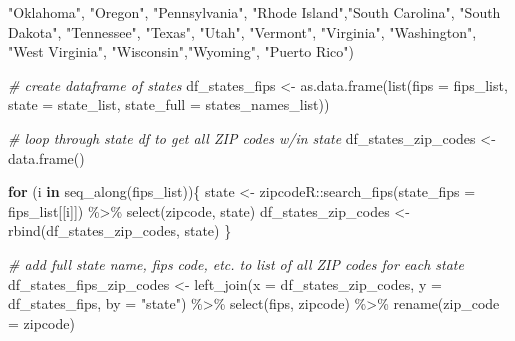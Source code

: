 \documentclass[
  11 pt,
  openany]{book}
\newenvironment{Shaded}{\begin{snugshade}}{\end{snugshade}}
\newcommand{\AttributeTok}[1]{\textcolor[rgb]{0.77,0.63,0.00}{#1}}
\newcommand{\CommentTok}[1]{\textcolor[rgb]{0.56,0.35,0.01}{\textit{#1}}}
\newcommand{\ControlFlowTok}[1]{\textcolor[rgb]{0.13,0.29,0.53}{\textbf{#1}}}
\newcommand{\FunctionTok}[1]{\textcolor[rgb]{0.00,0.00,0.00}{#1}}
\newcommand{\NormalTok}[1]{#1}
\newcommand{\OtherTok}[1]{\textcolor[rgb]{0.56,0.35,0.01}{#1}}
\newcommand{\SpecialCharTok}[1]{\textcolor[rgb]{0.00,0.00,0.00}{#1}}
\newcommand{\StringTok}[1]{\textcolor[rgb]{0.31,0.60,0.02}{#1}}
\begin{document}
\begin{Shaded}
\begin{Highlighting}[]
    \StringTok{"Oklahoma"}\NormalTok{, }\StringTok{"Oregon"}\NormalTok{, }\StringTok{"Pennsylvania"}\NormalTok{, }\StringTok{"Rhode Island"}\NormalTok{,}\StringTok{"South Carolina"}\NormalTok{, }
    \StringTok{"South Dakota"}\NormalTok{, }\StringTok{"Tennessee"}\NormalTok{, }\StringTok{"Texas"}\NormalTok{, }\StringTok{"Utah"}\NormalTok{, }\StringTok{"Vermont"}\NormalTok{, }\StringTok{"Virginia"}\NormalTok{, }
    \StringTok{"Washington"}\NormalTok{, }\StringTok{"West Virginia"}\NormalTok{, }\StringTok{"Wisconsin"}\NormalTok{,}\StringTok{"Wyoming"}\NormalTok{, }\StringTok{"Puerto Rico"}\NormalTok{)}

\CommentTok{\# create dataframe of states}
\NormalTok{df\_states\_fips }\OtherTok{\textless{}{-}} \FunctionTok{as.data.frame}\NormalTok{(}\FunctionTok{list}\NormalTok{(}\AttributeTok{fips =}\NormalTok{ fips\_list,}
                                     \AttributeTok{state =}\NormalTok{ state\_list,}
                                     \AttributeTok{state\_full =}\NormalTok{ states\_names\_list))}

\CommentTok{\# loop through state df to get all ZIP codes w/in state}
\NormalTok{df\_states\_zip\_codes }\OtherTok{\textless{}{-}} \FunctionTok{data.frame}\NormalTok{()}

\ControlFlowTok{for}\NormalTok{ (i }\ControlFlowTok{in} \FunctionTok{seq\_along}\NormalTok{(fips\_list))\{}
\NormalTok{  state }\OtherTok{\textless{}{-}}\NormalTok{ zipcodeR}\SpecialCharTok{::}\FunctionTok{search\_fips}\NormalTok{(}\AttributeTok{state\_fips =}\NormalTok{ fips\_list[[i]]) }\SpecialCharTok{\%\textgreater{}\%} 
    \FunctionTok{select}\NormalTok{(zipcode, state)}
\NormalTok{  df\_states\_zip\_codes }\OtherTok{\textless{}{-}} \FunctionTok{rbind}\NormalTok{(df\_states\_zip\_codes, state)}
\NormalTok{\}}

\CommentTok{\# add full state name, fips code, etc. to list of all ZIP codes for each state}
\NormalTok{df\_states\_fips\_zip\_codes }\OtherTok{\textless{}{-}} 
  \FunctionTok{left\_join}\NormalTok{(}\AttributeTok{x =}\NormalTok{ df\_states\_zip\_codes,}
            \AttributeTok{y =}\NormalTok{ df\_states\_fips,}
            \AttributeTok{by =} \StringTok{"state"}\NormalTok{) }\SpecialCharTok{\%\textgreater{}\%} 
  \FunctionTok{select}\NormalTok{(fips, zipcode) }\SpecialCharTok{\%\textgreater{}\%} 
  \FunctionTok{rename}\NormalTok{(}\AttributeTok{zip\_code =}\NormalTok{ zipcode)}


\end{Highlighting}
\end{Shaded}
\end{document}
